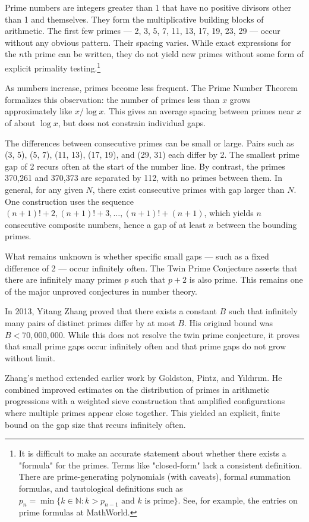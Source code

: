 Prime numbers are integers greater than 1 that have no positive divisors other than 1 and themselves. They form the multiplicative building blocks of arithmetic. The first few primes — 2, 3, 5, 7, 11, 13, 17, 19, 23, 29 — occur without any obvious pattern. Their spacing varies. While exact expressions for the $n$th prime can be written, they do not yield new primes without some form of explicit primality testing.\footnote{It is difficult to make an accurate statement about whether there exists a "formula" for the primes. Terms like "closed-form" lack a consistent definition. There are prime-generating polynomials (with caveats), formal summation formulas, and tautological definitions such as $p_n = \min\{k \in \mathbb{N} : k > p_{n-1} \text{ and } k \text{ is prime}\}$. See, for example, the entries on prime formulas at MathWorld.}


As numbers increase, primes become less frequent. The Prime Number Theorem formalizes this observation: the number of primes less than $x$ grows approximately like $x / \log x$. This gives an average spacing between primes near $x$ of about $\log x$, but does not constrain individual gaps.

The differences between consecutive primes can be small or large. Pairs such as (3, 5), (5, 7), (11, 13), (17, 19), and (29, 31) each differ by 2. The smallest prime gap of 2 recurs often at the start of the number line. By contrast, the primes 370,261 and 370,373 are separated by 112, with no primes between them. In general, for any given $N$, there exist consecutive primes with gap larger than $N$. One construction uses the sequence $
(n+1)! + 2,  (n+1)! + 3,  \dots,  (n+1)! + (n+1)$, which yields $n$ consecutive composite numbers, hence a gap of at least $n$ between the bounding primes.

What remains unknown is whether specific small gaps — such as a fixed difference of 2 — occur infinitely often. The Twin Prime Conjecture asserts that there are infinitely many primes $p$ such that $p + 2$ is also prime. This remains one of the major unproved conjectures in number theory.

In 2013, Yitang Zhang proved that there exists a constant $B$ such that infinitely many pairs of distinct primes differ by at most $B$. His original bound was $B < 70{,}000{,}000$. While this does not resolve the twin prime conjecture, it proves that small prime gaps occur infinitely often and that prime gaps do not grow without limit.

Zhang's method extended earlier work by Goldston, Pintz, and Yıldırım. He combined improved estimates on the distribution of primes in arithmetic progressions with a weighted sieve construction that amplified configurations where multiple primes appear close together. This yielded an explicit, finite bound on the gap size that recurs infinitely often.

